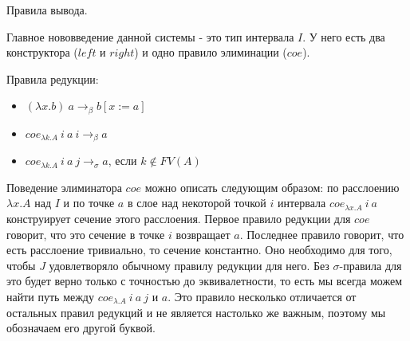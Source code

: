 \documentclass{amsart}
\theoremstyle{definition}
\theoremstyle{remark}
\numberwithin{figure}{section}
\begin{document}
\begin{table}
\begin{comment}
\medskip
\begin{center}
\def\extraVskip{1pt}
\Axiom$\fCenter \Gamma \vdash i : I$
\noLine
\UnaryInf$\fCenter \Gamma \vdash j : I$
\Axiom$\fCenter \Gamma \vdash a : \Pi (y : I) A$
\noLine
\UnaryInf$\fCenter \Gamma \vdash a' : \Pi (y : I) A$
\noLine
\UnaryInf$\fCenter \Gamma \vdash f : I \to A[y := i]$
\def\extraVskip{2pt}
\RightLabel{, $a\ i =_\beta f\ left$, $f\ right =_\beta a'\ i$}
\BinaryInfC{$\Gamma \vdash fill_{\lambda y. A}\ a\ a'\ i\ f\ j : I \to A[y := j]$}
\DisplayProof
\end{center}
\end{comment}

\bigskip
\caption{Правила вывода.}
\label{table:inf-rules}
\end{table}

Главное нововведение данной системы - это тип интервала $I$.
У него есть два конструктора ($left$ и $right$) и одно правило элиминации ($coe$).

Правила редукции:
\begin{itemize}
\item $(\lambda x.b)\ a \to_\beta b[x := a]$
\item $coe_{\lambda k.A}\ i\ a\ i \to_\beta a$
\item $coe_{\lambda k.A}\ i\ a\ j \to_\sigma a$, если $k \notin FV(A)$
\end{itemize}


Поведение элиминатора $coe$ можно описать следующим образом:
по расслоению $\lambda x. A$ над $I$ и по точке $a$ в слое над некоторой точкой $i$ интервала $coe_{\lambda x. A}\ i\ a$ конструирует сечение этого расслоения.
Первое правило редукции для $coe$ говорит, что это сечение в точке $i$ возвращает $a$.
Последнее правило говорит, что есть расслоение тривиально, то сечение константно.
Оно необходимо для того, чтобы $J$ удовлетворяло обычному правилу редукции для него.
Без $\sigma$-правила для это будет верно только с точностью до эквивалетности, то есть мы всегда можем найти путь между $coe_{\lambda. A}\ i\ a\ j$ и $a$.
Это правило несколько отличается от остальных правил редукций и не является настолько же важным, поэтому мы обозначаем его другой буквой.
\end{document}
